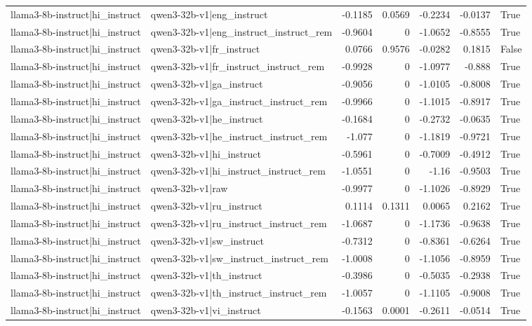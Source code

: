 \begin{table}
\begin{tabular}{l l r r r r l}
llama3-8b-instruct|hi_instruct & qwen3-32b-v1|eng_instruct & -0.1185 & 0.0569 & -0.2234 & -0.0137 & True \\
llama3-8b-instruct|hi_instruct & qwen3-32b-v1|eng_instruct_instruct_rem & -0.9604 & 0 & -1.0652 & -0.8555 & True \\
llama3-8b-instruct|hi_instruct & qwen3-32b-v1|fr_instruct & 0.0766 & 0.9576 & -0.0282 & 0.1815 & False \\
llama3-8b-instruct|hi_instruct & qwen3-32b-v1|fr_instruct_instruct_rem & -0.9928 & 0 & -1.0977 & -0.888 & True \\
llama3-8b-instruct|hi_instruct & qwen3-32b-v1|ga_instruct & -0.9056 & 0 & -1.0105 & -0.8008 & True \\
llama3-8b-instruct|hi_instruct & qwen3-32b-v1|ga_instruct_instruct_rem & -0.9966 & 0 & -1.1015 & -0.8917 & True \\
llama3-8b-instruct|hi_instruct & qwen3-32b-v1|he_instruct & -0.1684 & 0 & -0.2732 & -0.0635 & True \\
llama3-8b-instruct|hi_instruct & qwen3-32b-v1|he_instruct_instruct_rem & -1.077 & 0 & -1.1819 & -0.9721 & True \\
llama3-8b-instruct|hi_instruct & qwen3-32b-v1|hi_instruct & -0.5961 & 0 & -0.7009 & -0.4912 & True \\
llama3-8b-instruct|hi_instruct & qwen3-32b-v1|hi_instruct_instruct_rem & -1.0551 & 0 & -1.16 & -0.9503 & True \\
llama3-8b-instruct|hi_instruct & qwen3-32b-v1|raw & -0.9977 & 0 & -1.1026 & -0.8929 & True \\
llama3-8b-instruct|hi_instruct & qwen3-32b-v1|ru_instruct & 0.1114 & 0.1311 & 0.0065 & 0.2162 & True \\
llama3-8b-instruct|hi_instruct & qwen3-32b-v1|ru_instruct_instruct_rem & -1.0687 & 0 & -1.1736 & -0.9638 & True \\
llama3-8b-instruct|hi_instruct & qwen3-32b-v1|sw_instruct & -0.7312 & 0 & -0.8361 & -0.6264 & True \\
llama3-8b-instruct|hi_instruct & qwen3-32b-v1|sw_instruct_instruct_rem & -1.0008 & 0 & -1.1056 & -0.8959 & True \\
llama3-8b-instruct|hi_instruct & qwen3-32b-v1|th_instruct & -0.3986 & 0 & -0.5035 & -0.2938 & True \\
llama3-8b-instruct|hi_instruct & qwen3-32b-v1|th_instruct_instruct_rem & -1.0057 & 0 & -1.1105 & -0.9008 & True \\
llama3-8b-instruct|hi_instruct & qwen3-32b-v1|vi_instruct & -0.1563 & 0.0001 & -0.2611 & -0.0514 & True \\

\end{tabular}
\end{table}
